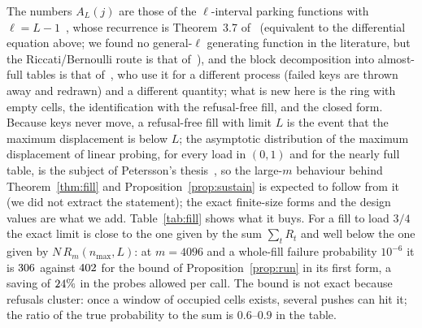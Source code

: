 \documentclass[11pt,a4paper]{article}
\theoremstyle{definition}
\theoremstyle{remark}
\begin{document}
The numbers $A_L(j)$ are those of the $\ell$-interval parking functions with $\ell=L-1$~\cite{colaric2021,aguilarfraga2024}, whose recurrence is Theorem~3.7 of~\cite{aguilarfraga2024} (equivalent to the differential equation above; we found no general-$\ell$ generating function in the literature, but the Riccati/Bernoulli route is that of~\cite{abb2026}), and the block decomposition into almost-full tables is that of~\cite{abb2026}, who use it for a different process (failed keys are thrown away and redrawn) and a different quantity; what is new here is the ring with empty cells, the identification with the refusal-free fill, and the closed form. Because keys never move, a refusal-free fill with limit $L$ is the event that the maximum displacement is below $L$; the asymptotic distribution of the maximum displacement of linear probing, for every load in $(0,1)$ and for the nearly full table, is the subject of Petersson's thesis~\cite{petersson2009}, so the large-$m$ behaviour behind Theorem~\ref{thm:fill} and Proposition~\ref{prop:sustain} is expected to follow from it (we did not extract the statement); the exact finite-size forms and the design values are what we add. Table~\ref{tab:fill} shows what it buys. For a fill to load $3/4$ the exact limit is close to the one given by the sum $\sum_tR_t$ and well below the one given by $N\,R_m(n_{\max},L)$: at $m=4096$ and a whole-fill failure probability $10^{-6}$ it is $306$ against $402$ for the bound of Proposition~\ref{prop:run} in its first form, a saving of $24\%$ in the probes allowed per call. The bound is not exact because refusals cluster: once a window of occupied cells exists, several pushes can hit it; the ratio of the true probability to the sum is $0.6$--$0.9$ in the table.

\begin{table}[t]
\centering\small
\caption{Smallest probe limit $L$ for which a fill to load $3/4$ is refusal-free with probability at least $1-\varepsilon'$: exact (Theorem~\ref{thm:fill}), by the sum $\Lambda=\sum_tR_t$, and by $N\,R_{\max}$ with $N=n$; last column: true failure probability divided by $\Lambda$ at the exact limit.}\label{tab:fill}

\end{table}
\end{document}
